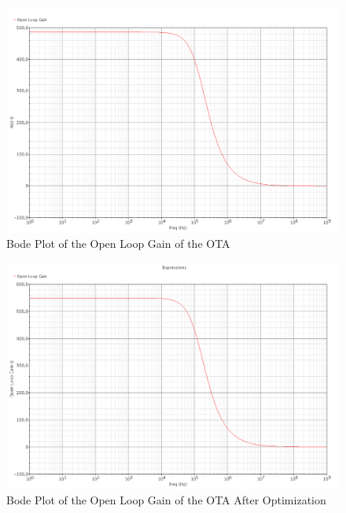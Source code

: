 \documentclass{article}
\begin{document}
\begin{figure}[H]
\centering
\includegraphics[width=6in]{bullet4_bode.png}
\caption{Bode Plot of the Open Loop Gain of the OTA}
\label{b4_bode}
\end{figure}

\begin{figure}[H]
\centering
\includegraphics[width=6in]{bullet4_bode_opt.png}
\caption{Bode Plot of the Open Loop Gain of the OTA After Optimization}
\label{b4_bode_opt}
\end{figure}
\newpage
\end{document}
